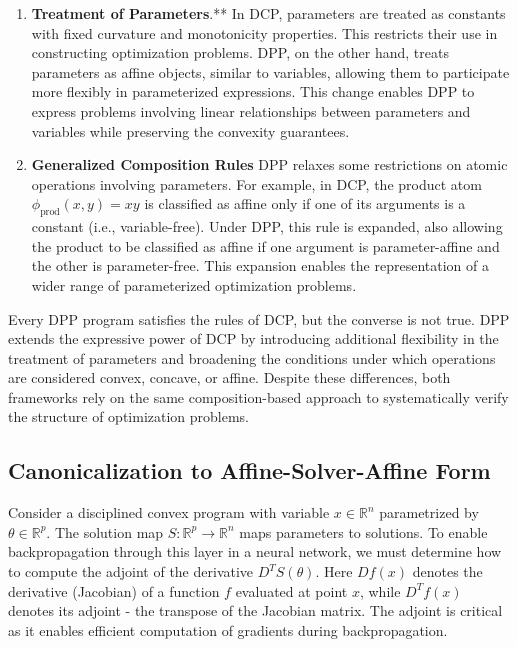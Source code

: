 \documentclass{article}
\begin{document}
\begin{enumerate}
    \item \textbf{Treatment of Parameters}.** In DCP, parameters are treated as constants with fixed curvature and monotonicity properties. This restricts their use in constructing optimization problems. DPP, on the other hand, treats parameters as affine objects, similar to variables, allowing them to participate more flexibly in parameterized expressions. This change enables DPP to express problems involving linear relationships between parameters and variables while preserving the convexity guarantees.
    \item  \textbf{Generalized Composition Rules} DPP relaxes some restrictions on atomic operations involving parameters. For example, in DCP, the product atom \(\phi_{\text{prod}}(x, y) = xy\) is classified as affine only if one of its arguments is a constant (i.e., variable-free). Under DPP, this rule is expanded, also allowing the product to be classified as affine if one argument is parameter-affine and the other is parameter-free. This expansion enables the representation of a wider range of parameterized optimization problems.
\end{enumerate}

Every DPP program satisfies the rules of DCP, but the converse is not true. DPP extends the expressive power of DCP by introducing additional flexibility in the treatment of parameters and broadening the conditions under which operations are considered convex, concave, or affine. Despite these differences, both frameworks rely on the same composition-based approach to systematically verify the structure of optimization problems.

\subsection{Canonicalization to Affine-Solver-Affine Form}

Consider a disciplined convex program with variable $x \in \mathbb{R}^n$ parametrized by $\theta \in \mathbb{R}^p$. The solution map $S: \mathbb{R}^p \to \mathbb{R}^n$ maps parameters to solutions. To enable backpropagation through this layer in a neural network, we must determine how to compute the adjoint of the derivative $D^T S(\theta)$. Here $Df(x)$ denotes the derivative (Jacobian) of a function $f$ evaluated at point $x$, while $D^T f(x)$ denotes its adjoint - the transpose of the Jacobian matrix. The adjoint is critical as it enables efficient computation of gradients during backpropagation.
\end{document}

